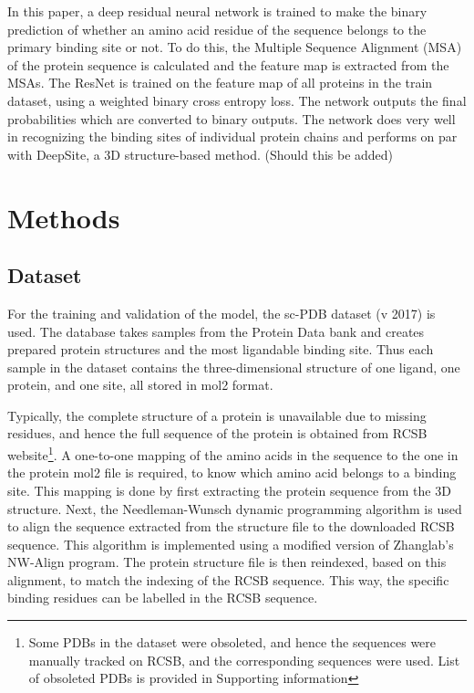\documentclass[journal=jacsat,manuscript=article]{achemso}
\begin{document}
In this paper, a deep residual neural network is trained to make the binary prediction of whether an amino acid residue of the sequence belongs to the primary binding site or not. To do this, the Multiple Sequence Alignment (MSA) of the protein sequence is calculated and the feature map is extracted from the MSAs. The ResNet is trained on the feature map of all proteins in the train dataset, using a weighted binary cross entropy loss. The network outputs the final probabilities which are converted to binary outputs. The network does very well in recognizing the binding sites of individual protein chains and performs on par with DeepSite, a 3D structure-based method. (Should this be added)

\section{Methods}
\subsection{Dataset}
\quad For the training and validation of the model, the sc-PDB\cite{desaphy2015sc} dataset (v 2017) is used. The database takes samples from the Protein Data bank and creates prepared protein structures and the most ligandable binding site. Thus each sample in the dataset contains the three-dimensional structure of one ligand, one protein, and one site, all stored in mol2 format.

Typically, the complete structure of a protein is unavailable due to missing residues, and hence the full sequence of the protein is obtained from RCSB \cite{burley2019rcsb} website\footnote{Some PDBs in the dataset were obsoleted, and hence the sequences were manually tracked on RCSB, and the corresponding sequences were used. List of obsoleted PDBs is provided in Supporting information}. A one-to-one mapping of the amino acids in the sequence to the one in the protein mol2 file is required, to know which amino acid belongs to a binding site. This mapping is done by first extracting the protein sequence from the 3D structure. Next, the Needleman-Wunsch dynamic programming algorithm is used to align the sequence extracted from the structure file to the downloaded RCSB sequence. This algorithm is implemented using a modified version of Zhanglab's NW-Align program\cite{NWAlign}. The protein structure file is then reindexed, based on this alignment, to match the indexing of the RCSB sequence. This way, the specific binding residues can be labelled in the RCSB sequence.
\end{document}
